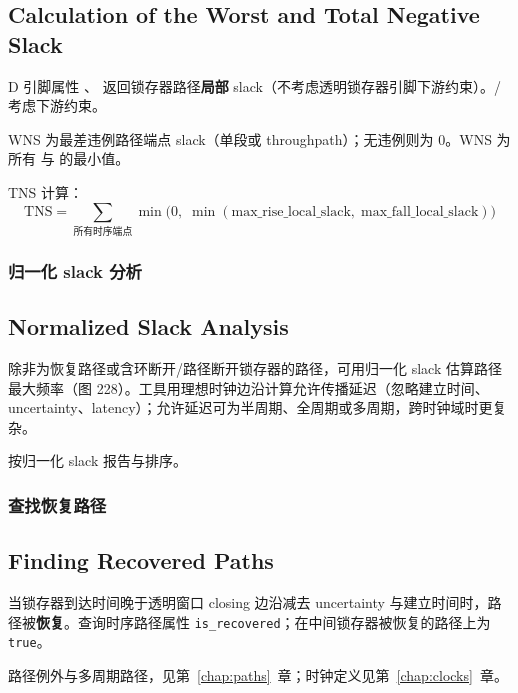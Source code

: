 \subsection*{Calculation of the Worst and Total Negative Slack}

D 引脚属性 、 返回锁存器路径\textbf{局部} slack（不考虑透明锁存器引脚下游约束）。/ 考虑下游约束。

WNS 为最差违例路径端点 slack（单段或 throughpath）；无违例则为 0。WNS 为所有  与  的最小值。

TNS 计算：
\[
\mathrm{TNS} = \sum_{\text{所有时序端点}} \min\bigl(0,\; \min(\mathrm{max\_rise\_local\_slack},\; \mathrm{max\_fall\_local\_slack})\bigr)
\]

\subsubsection{归一化 slack 分析}
\subsection*{Normalized Slack Analysis}

除非为恢复路径或含环断开/路径断开锁存器的路径，可用归一化 slack 估算路径最大频率（图 228）。工具用理想时钟边沿计算允许传播延迟（忽略建立时间、uncertainty、latency）；允许延迟可为半周期、全周期或多周期，跨时钟域时更复杂。

 按归一化 slack 报告与排序。

\subsubsection{查找恢复路径}
\subsection*{Finding Recovered Paths}

当锁存器到达时间晚于透明窗口 closing 边沿减去 uncertainty 与建立时间时，路径被\textbf{恢复}。查询时序路径属性 \texttt{is\_recovered}；在中间锁存器被恢复的路径上为 \texttt{true}。

\begin{seeAlsoBox}
路径例外与多周期路径，见第~\ref{chap:paths}~章；时钟定义见第~\ref{chap:clocks}~章。
\end{seeAlsoBox}


